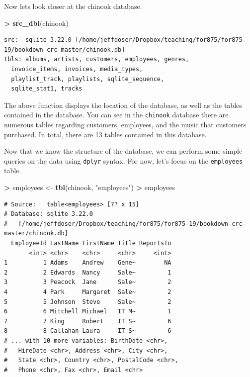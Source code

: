 \documentclass[]{krantz}
\makeatletter
\newenvironment{Shaded}{\begin{snugshade}}{\end{snugshade}}
\newcommand{\KeywordTok}[1]{\textcolor[rgb]{0.27,0.27,0.27}{\textbf{#1}}}
\newcommand{\StringTok}[1]{\textcolor[rgb]{0.5,0.5,0.5}{#1}}
\newcommand{\OperatorTok}[1]{\textcolor[rgb]{0.43,0.43,0.43}{\textbf{#1}}}
\newcommand{\NormalTok}[1]{#1}
\newenvironment{kframe}{%
\medskip{}
\setlength{\fboxsep}{.8em}
 \def\at@end@of@kframe{}%
 \ifinner\ifhmode%
  \def\at@end@of@kframe{\end{minipage}}%
  \begin{minipage}{\columnwidth}%
 \fi\fi%
 \def\FrameCommand##1{\hskip\@totalleftmargin \hskip-\fboxsep
 \colorbox{shadecolor}{##1}\hskip-\fboxsep
     \hskip-\linewidth \hskip-\@totalleftmargin \hskip\columnwidth}%
 \MakeFramed {\advance\hsize-\width
   \@totalleftmargin\z@ \linewidth\hsize
   \@setminipage}}%
 {\par\unskip\endMakeFramed%
 \at@end@of@kframe}
\renewenvironment{Shaded}{\begin{kframe}}{\end{kframe}}
\makeatother
\begin{document}
Now lets look closer at the chinook database.

\begin{Shaded}
\begin{Highlighting}[]
\OperatorTok{>}\StringTok{ }\KeywordTok{src_dbi}\NormalTok{(chinook)}
\end{Highlighting}
\end{Shaded}

\begin{verbatim}
src:  sqlite 3.22.0 [/home/jeffdoser/Dropbox/teaching/for875/for875-19/bookdown-crc-master/chinook.db]
tbls: albums, artists, customers, employees, genres,
  invoice_items, invoices, media_types,
  playlist_track, playlists, sqlite_sequence,
  sqlite_stat1, tracks
\end{verbatim}

The above function displays the location of the database, as well as the
tables contained in the database. You can see in the \texttt{chinook}
database there are numerous tables regarding customers, employees, and
the music that customers purchased. In total, there are 13 tables
contained in this database.

Now that we know the structure of the database, we can perform some
simple queries on the data using \texttt{dplyr} syntax. For now, let's
focus on the \texttt{employees} table.

\begin{Shaded}
\begin{Highlighting}[]
\OperatorTok{>}\StringTok{ }\NormalTok{employees <-}\StringTok{ }\KeywordTok{tbl}\NormalTok{(chinook, }\StringTok{"employees"}\NormalTok{)}
\OperatorTok{>}\StringTok{ }\NormalTok{employees}
\end{Highlighting}
\end{Shaded}

\begin{verbatim}
# Source:   table<employees> [?? x 15]
# Database: sqlite 3.22.0
#   [/home/jeffdoser/Dropbox/teaching/for875/for875-19/bookdown-crc-master/chinook.db]
  EmployeeId LastName FirstName Title ReportsTo
       <int> <chr>    <chr>     <chr>     <int>
1          1 Adams    Andrew    Gene~        NA
2          2 Edwards  Nancy     Sale~         1
3          3 Peacock  Jane      Sale~         2
4          4 Park     Margaret  Sale~         2
5          5 Johnson  Steve     Sale~         2
6          6 Mitchell Michael   IT M~         1
7          7 King     Robert    IT S~         6
8          8 Callahan Laura     IT S~         6
# ... with 10 more variables: BirthDate <chr>,
#   HireDate <chr>, Address <chr>, City <chr>,
#   State <chr>, Country <chr>, PostalCode <chr>,
#   Phone <chr>, Fax <chr>, Email <chr>
\end{verbatim}
\end{document}
